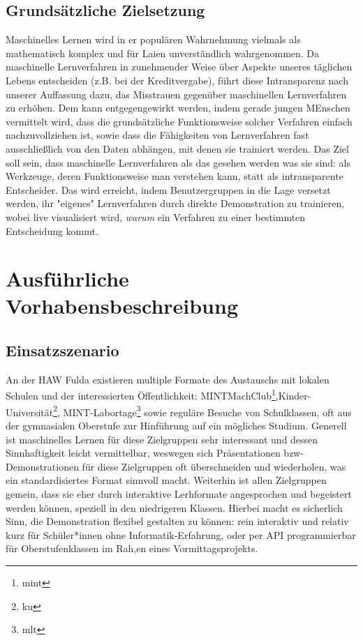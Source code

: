 \documentclass{article}
\begin{document}
\subsection{Grundsätzliche Zielsetzung}
%
Maschinelles Lernen wird in er populären Wahrnehmung vielmals als mathematisch komplex und für Laien unverständlich wahrgenommen. Da maschinelle Lernverfahren in zunehmender Weise über Aspekte unseres täglichen Lebens entscheiden (z.B. bei der Kreditvergabe), führt diese Intransparenz nach unserer Auffassung dazu, das Misstrauen gegenüber maschinellen Lernverfahren zu erhöhen. Dem kann entgegengewirkt werden, indem gerade jungen MEnschen vermittelt wird, dass
die grundsätzliche Funktionsweise solcher Verfahren einfach nachzuvollziehen ist, sowie dass die Fähigkeiten von Lernverfahren fast ausschließlich von den Daten abhängen, mit denen sie trainiert werden. Das Ziel soll sein, dass maschinelle Lernverfahren als das gesehen werden was sie sind: als Werkzeuge, deren Funktionsweise man verstehen kann, statt als intransparente Entscheider. 
Das wird erreicht, indem Benutzergruppen in die Lage versetzt werden, ihr "eigenes" Lernverfahren durch direkte Demonstration zu trainieren, wobei live visualisiert wird, {\it warum} ein Verfahren zu einer bestimmten Entscheidung kommt.
%
\renewcommand{\thesection}{4}
\section{Ausführliche Vorhabensbeschreibung}
\subsection{Einsatzszenario}
An der HAW Fulda existieren multiple Formate des Austauschs mit lokalen Schulen und der interessierten Öffentlichkeit: MINTMachClub\footnote{mint},Kinder-Universität\footnote{ku}, MINT-Labortage\footnote{mlt} sowie
reguläre Besuche von Schulklassen, oft aus der gymnasialen Oberstufe zur Hinführung auf ein mögliches Studium. Generell ist maschinelles Lernen für diese Zielgruppen sehr interessant und dessen Sinnhaftigkeit leicht vermittelbar, weswegen sich Präsentationen bzw- Demonstrationen für diese Zielgruppen oft überschneiden und wiederholen, was ein standardisiertes Format sinnvoll macht. 
Weiterhin ist allen Zielgruppen gemein, dass sie eher durch interaktive Lerhformate angesprochen und begeistert werden können, speziell in den niedrigeren Klassen. Hierbei macht es sicherlich Sinn, die Demonstration flexibel gestalten zu können:
rein interaktiv und relativ kurz für Schüler*innen ohne Informatik-Erfahrung, oder per API programmierbar für Oberstufenklassen im Rah,en eines Vormittagsprojekts. 
%
\end{document}
